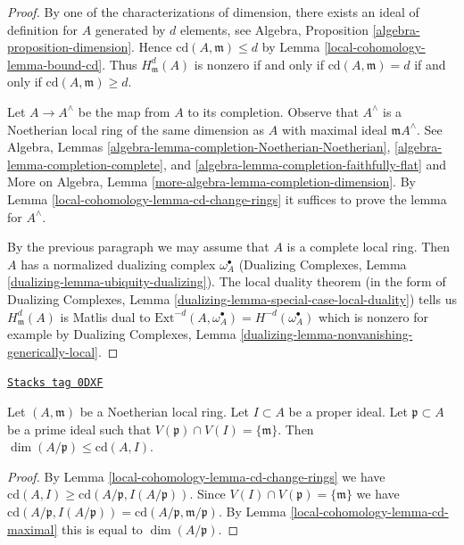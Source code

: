 \begin{proof}
By one of the characterizations of dimension, there exists
an ideal of definition for $A$ generated by $d$ elements, see
Algebra, Proposition \ref{algebra-proposition-dimension}.
Hence $\text{cd}(A, \mathfrak m) \leq d$ by
Lemma \ref{local-cohomology-lemma-bound-cd}. Thus $H^d_\mathfrak m(A)$ is
nonzero if and only if $\text{cd}(A, \mathfrak m) = d$ if and only if
$\text{cd}(A, \mathfrak m) \geq d$.

\medskip\noindent
Let $A \to A^\wedge$ be the map from $A$ to its completion.
Observe that $A^\wedge$ is a Noetherian local ring of the
same dimension as $A$ with maximal ideal $\mathfrak m A^\wedge$.
See Algebra, Lemmas
\ref{algebra-lemma-completion-Noetherian-Noetherian},
\ref{algebra-lemma-completion-complete}, and
\ref{algebra-lemma-completion-faithfully-flat} and
More on Algebra, Lemma \ref{more-algebra-lemma-completion-dimension}.
By Lemma \ref{local-cohomology-lemma-cd-change-rings}
it suffices to prove the lemma for $A^\wedge$.

\medskip\noindent
By the previous paragraph we may assume that $A$ is
a complete local ring. Then $A$ has a normalized dualizing complex
$\omega_A^\bullet$ (Dualizing Complexes, Lemma
\ref{dualizing-lemma-ubiquity-dualizing}).
The local duality theorem (in the form of
Dualizing Complexes, Lemma \ref{dualizing-lemma-special-case-local-duality})
tells us $H^d_\mathfrak m(A)$ is Matlis dual to
$\text{Ext}^{-d}(A, \omega_A^\bullet) = H^{-d}(\omega_A^\bullet)$
which is nonzero for example by
Dualizing Complexes, Lemma
\ref{dualizing-lemma-nonvanishing-generically-local}.
\end{proof}

\begin{lemma}
\label{local-cohomology-lemma-cd-bound-dim-local}
\href{https://stacks.math.columbia.edu/tag/0DXF}{\texttt{Stacks tag 0DXF}}

Let $(A, \mathfrak m)$ be a Noetherian local ring.
Let $I \subset A$ be a proper ideal.
Let $\mathfrak p \subset A$ be a prime ideal
such that $V(\mathfrak p) \cap V(I) = \{\mathfrak m\}$.
Then $\dim(A/\mathfrak p) \leq \text{cd}(A, I)$.
\end{lemma}

\begin{proof}
By Lemma \ref{local-cohomology-lemma-cd-change-rings} we have
$\text{cd}(A, I) \geq \text{cd}(A/\mathfrak p, I(A/\mathfrak p))$.
Since $V(I) \cap V(\mathfrak p) = \{\mathfrak m\}$ we have
$\text{cd}(A/\mathfrak p, I(A/\mathfrak p)) =
\text{cd}(A/\mathfrak p, \mathfrak m/\mathfrak p)$.
By Lemma \ref{local-cohomology-lemma-cd-maximal} this is equal to $\dim(A/\mathfrak p)$.
\end{proof}

